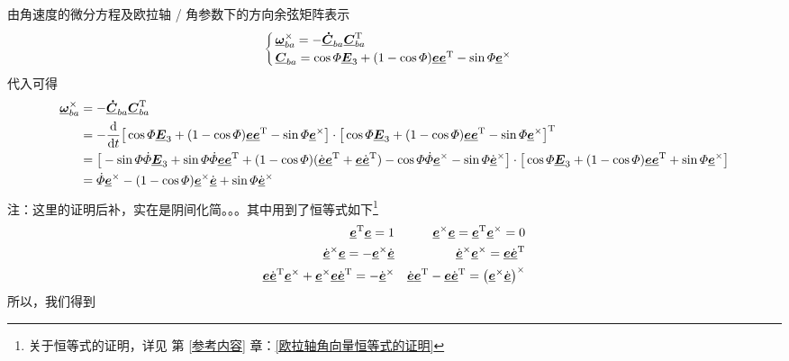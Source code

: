 由角速度的微分方程及欧拉轴 / 角参数下的方向余弦矩阵表示
\begin{equation*}
	\begin{cases}
		\, \underline{\bm{\omega}}_{ba}^\times = - \underline{\bm{\dot{C}}}_{ba} \underline{\bm{C}}_{ba}^{\text{T}} \\
		\, \underline{\bm{C}}_{ba} = \cos \varPhi \underline{\bm{E}}_3 + (1 - \cos \varPhi) \underline{\bm{e}} \underline{\bm{e}}^{\text{T}} - \sin \varPhi \underline{\bm{e}}^\times
	\end{cases}
\end{equation*}
代入可得
\begin{align*}
	\underline{\bm{\omega}}_{ba}^\times &= - \underline{\bm{\dot{C}}}_{ba} \underline{\bm{C}}_{ba}^{\text{T}} \\
	&= - \dfrac{{\rm{d}} }{{\rm{d}} t} \big[ \cos \varPhi \underline{\bm{E}}_3 + (1 - \cos \varPhi) \underline{\bm{e}} \underline{\bm{e}}^{\text{T}} - \sin \varPhi \underline{\bm{e}}^ \times \big] \cdot \big[ \cos \varPhi \underline{\bm{E}}_3 + (1 - \cos \varPhi)\underline{\bm{e}}\underline{\bm{e}}^{\text{T}} - \sin \varPhi \underline{\bm{e}}^\times \big]^{\text{T}} \\
	&= \big[ -\sin \varPhi \dot{\varPhi} \underline{\bm{E}}_3 + \sin \varPhi \dot{\varPhi} \underline{\bm{e}} \underline{\bm{e}}^{\text{T}} + (1 - \cos \varPhi)  (\dot{\underline{\bm{e}}} \underline{\bm{e}}^{\text{T}} + \underline{\bm{e}} \dot{\underline{\bm{e}}}^{\text{T}}) - \cos \varPhi \dot{\varPhi} \underline{\bm{e}}^\times - \sin \varPhi \dot{\underline{\bm{e}}}^\times \big] \cdot \big[ \cos \varPhi \underline{\bm{E}}_3 + (1 - \cos \varPhi)\underline{\bm{e}}\underline{\bm{e}}^{\text{T}} + \sin \varPhi \underline{\bm{e}}^\times \big] \\
	&= \dot{\varPhi}\underline{\bm{e}}^\times - (1 - \cos \varPhi) \underline{\bm{e}}^\times \dot{\underline{\bm{e}}} + \sin \varPhi \dot{\underline{\bm{e}}}^\times
\end{align*}
注：这里的证明后补，实在是阴间化简。。。其中用到了恒等式如下\footnote[1]{关于恒等式的证明，详见 第 \ref{参考内容} 章：\ref{欧拉轴角向量恒等式的证明}  \link[欧拉轴角向量恒等式的证明]}
\begin{align*}
	\underline{\bm{e}}^{\text{T}} \underline{\bm{e}} = 1 && \underline{\bm{e}}^\times \underline{\bm{e}} = \underline{\bm{e}}^{\text{T}} \underline{\bm{e}}^\times = 0 \\
	\dot{\underline{\bm{e}}}^\times \underline{\bm{e}} = - \underline{\bm{e}}^\times \dot{\underline{\bm{e}}} && \dot{\underline{\bm{e}}}^\times \underline{\bm{e}}^\times = \underline{\bm{e}} \dot{\underline{\bm{e}}}^{\text{T}} \\
	\underline{\bm{e}} \dot{\underline{\bm{e}}}^{\text{T}} \underline{\bm{e}}^\times  + \underline{\bm{e}}^\times \underline{\bm{e}} \dot{\underline{\bm{e}}}^{\text{T}} = - \dot{\underline{\bm{e}}}^\times && \dot{\underline{\bm{e}}} \underline{\bm{e}}^{\text{T}} - \underline{\bm{e}}\dot{\underline{\bm{e}}}^{\text{T}} = \big( \underline{\bm{e}}^\times \dot{\underline{\bm{e}}} \big)^\times
\end{align*}
所以，我们得到



